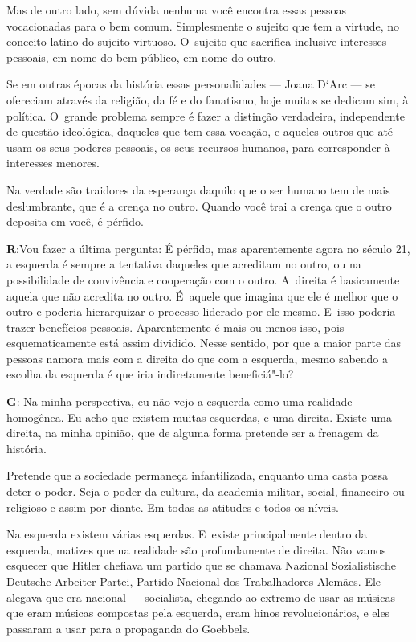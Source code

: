  

Mas de outro lado, sem dúvida nenhuma você encontra essas pessoas
vocacionadas para o bem comum. Simplesmente o sujeito que tem a
virtude, no conceito latino do sujeito virtuoso. O~sujeito que
sacrifica inclusive interesses pessoais, em nome do bem público, em nome
do outro.

 

Se em outras épocas da história essas personalidades --- Joana D`Arc ---
se ofereciam através da religião, da fé e do fanatismo, hoje
muitos se dedicam sim, à política. O~grande problema sempre é fazer a
distinção verdadeira, independente de questão ideológica, daqueles que
tem essa vocação, e aqueles outros que até usam os seus poderes
pessoais, os seus recursos humanos, para corresponder à interesses
menores.

 

Na verdade são traidores da esperança daquilo que o ser humano tem de
mais deslumbrante, que é a crença no outro. Quando você trai a crença
que o outro deposita em você, é pérfido.

 

\textbf{R}:Vou fazer a última pergunta: É pérfido, mas aparentemente
agora no século 21, a esquerda é sempre a tentativa daqueles que
acreditam no outro, ou na possibilidade de convivência e cooperação com
o outro. A~direita é basicamente aquela que não acredita no outro. É~aquele que imagina que ele é melhor que o outro e poderia hierarquizar o
processo liderado por ele mesmo. E~isso poderia trazer benefícios
pessoais. Aparentemente é mais ou menos isso, pois esquematicamente está
assim dividido. Nesse sentido, por que a maior parte das pessoas namora
mais com a direita do que com a esquerda, mesmo sabendo a escolha da
esquerda é que iria indiretamente beneficiá"-lo?

 

\textbf{G}: Na minha perspectiva, eu não vejo a esquerda como uma
realidade homogênea. Eu acho que existem muitas esquerdas, e uma
direita. Existe uma direita, na minha opinião, que de alguma forma
pretende ser a frenagem da história.

 

Pretende que a sociedade permaneça infantilizada, enquanto uma casta
possa deter o poder. Seja o poder da cultura, da academia militar,
social, financeiro ou religioso e assim por diante. Em todas as atitudes
e todos os níveis.

 

Na esquerda existem várias esquerdas. E~existe principalmente dentro da
esquerda, matizes que na realidade são profundamente de direita. Não
vamos esquecer que Hitler chefiava um partido que se chamava Nazional
Sozialistische Deutsche Arbeiter Partei, Partido Nacional dos
Trabalhadores Alemães. Ele alegava que era nacional --- socialista,
chegando ao extremo de usar as músicas que eram músicas compostas pela
esquerda, eram hinos revolucionários, e eles passaram a usar para a
propaganda do Goebbels. 

